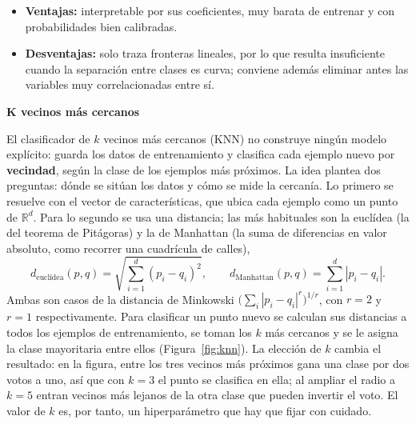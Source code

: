 \documentclass[12pt,a4paper]{report}
\theoremstyle{definition}
\begin{document}
\begin{itemize}
\item \textbf{Ventajas:} interpretable por sus coeficientes, muy barata de entrenar y con
probabilidades bien calibradas.
\item \textbf{Desventajas:} solo traza fronteras lineales, por lo que resulta insuficiente cuando la
separación entre clases es curva; conviene además eliminar antes las variables muy correlacionadas
entre sí.
\end{itemize}

\bigskip
\noindent\textbf{\large K vecinos más cercanos}
\label{sec:knn}

\medskip
El clasificador de $k$ vecinos más cercanos (KNN) \cite{cover1967knn} no construye ningún modelo
explícito: guarda los datos de entrenamiento y clasifica cada ejemplo nuevo por \textbf{vecindad},
según la clase de los ejemplos más próximos. La idea plantea dos preguntas: dónde se sitúan
los datos y cómo se mide la cercanía. Lo primero se resuelve con el vector de características, que ubica
cada ejemplo como un punto de $\mathbb{R}^d$. Para lo segundo se usa una distancia; las más habituales
son la euclídea (la del teorema de Pitágoras) y la de Manhattan (la suma de diferencias en valor
absoluto, como recorrer una cuadrícula de calles),
\begin{equation}
d_{\text{euclídea}}(p,q)=\sqrt{\textstyle\sum_{i=1}^{d} (p_i-q_i)^2},\qquad
d_{\text{Manhattan}}(p,q)=\textstyle\sum_{i=1}^{d} |p_i-q_i|.
\label{eq:distancias}
\end{equation}
Ambas son casos de la distancia de Minkowski $\big(\sum_i |p_i-q_i|^r\big)^{1/r}$, con $r=2$ y $r=1$
respectivamente. Para clasificar un
punto nuevo se calculan sus distancias a todos los ejemplos de entrenamiento, se toman los $k$ más
cercanos y se le asigna la clase mayoritaria entre ellos (Figura~\ref{fig:knn}). La elección de $k$
cambia el resultado: en la figura, entre los tres vecinos más próximos gana una clase por dos votos a
uno, así que con $k=3$ el punto se clasifica en ella; al ampliar el radio a $k=5$ entran vecinos más
lejanos de la otra clase que pueden invertir el voto. El valor de $k$ es, por tanto, un hiperparámetro
que hay que fijar con cuidado.
\end{document}
